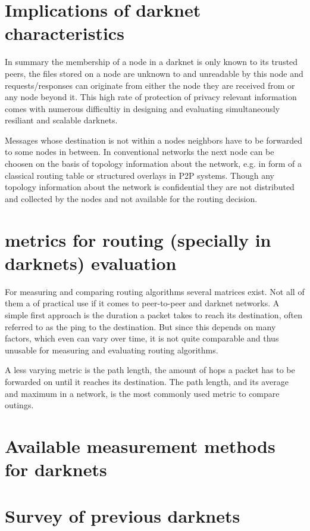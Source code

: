 \section{Implications of darknet characteristics}

In summary the membership of a node in a darknet is only known to its trusted peers, the files stored on a node are unknown to and unreadable by this node and requests/responses can originate from either the node they are received from or any node beyond it. This high rate of protection of privacy relevant information comes with numerous difficultiy in designing and evaluating simultaneously resiliant and scalable darknets.

Messages whose destination is not within a nodes neighbors have to be forwarded to some nodes in between. In conventional networks the next node can be choosen on the basis of topology information about the network, e.g. in form of a classical routing table or structured overlays in P2P systems. Though any topology information about the network is confidential they are not distributed and collected by the nodes and not available for the routing decision.

\section{metrics for routing (specially in darknets) evaluation}

For measuring and comparing routing algorithms several matrices exist. Not all of them a of practical use if it comes to peer-to-peer and darknet networks. A simple first approach  is the duration a packet takes to reach its destination, often referred to as the ping to the destination. But since this depends on many factors, which even can vary over time, it is not quite comparable and thus unusable for measuring and evaluating routing algorithms.

A less varying metric is the path length, the amount of hops a packet has to be forwarded on until it reaches its destination. The path length, and its average and maximum in a network, is the most commonly used metric to compare outings.



\section{Available measurement methods for darknets}


\section{Survey of previous darknets}


